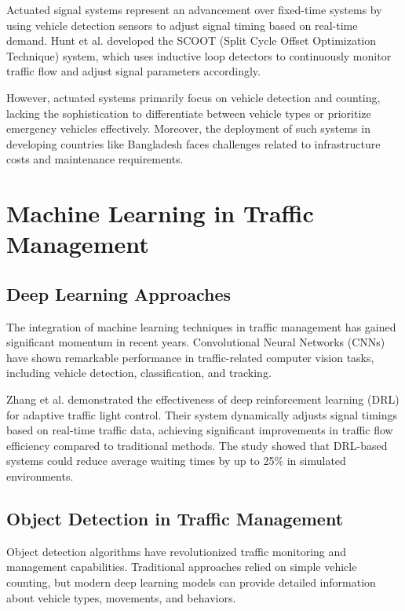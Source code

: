 Actuated signal systems represent an advancement over fixed-time systems by using vehicle detection sensors to adjust signal timing based on real-time demand. Hunt et al. \cite{hunt1981scoot} developed the SCOOT (Split Cycle Offset Optimization Technique) system, which uses inductive loop detectors to continuously monitor traffic flow and adjust signal parameters accordingly.

However, actuated systems primarily focus on vehicle detection and counting, lacking the sophistication to differentiate between vehicle types or prioritize emergency vehicles effectively. Moreover, the deployment of such systems in developing countries like Bangladesh faces challenges related to infrastructure costs and maintenance requirements.

\section{Machine Learning in Traffic Management}

\subsection{Deep Learning Approaches}

The integration of machine learning techniques in traffic management has gained significant momentum in recent years. Convolutional Neural Networks (CNNs) have shown remarkable performance in traffic-related computer vision tasks, including vehicle detection, classification, and tracking.

Zhang et al. \cite{zhang2020intelligent} demonstrated the effectiveness of deep reinforcement learning (DRL) for adaptive traffic light control. Their system dynamically adjusts signal timings based on real-time traffic data, achieving significant improvements in traffic flow efficiency compared to traditional methods. The study showed that DRL-based systems could reduce average waiting times by up to 25\% in simulated environments.

\subsection{Object Detection in Traffic Management}

Object detection algorithms have revolutionized traffic monitoring and management capabilities. Traditional approaches relied on simple vehicle counting, but modern deep learning models can provide detailed information about vehicle types, movements, and behaviors.


